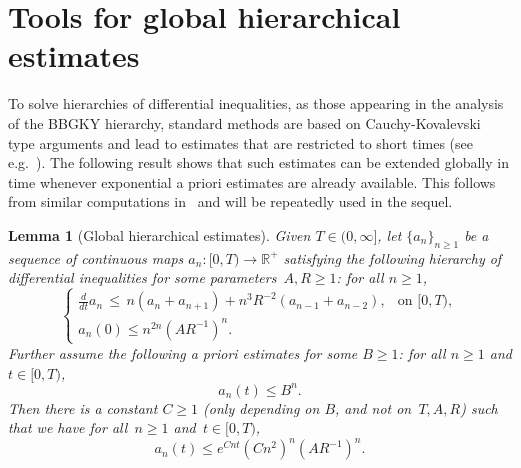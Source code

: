 \documentclass[a4paper,11pt,reqno,noindent]{amsart}
\theoremstyle{plain}
\newtheorem{lem}[theor]{Lemma}
\theoremstyle{definition}
\numberwithin{equation}{section}
\newcommand{\R}{\mathbb R}
\begin{document}
\section{Tools for global hierarchical estimates}
To solve hierarchies of differential inequalities, as those appearing in the analysis of the BBGKY hierarchy, standard methods are based on Cauchy-Kovalevski type arguments and lead to estimates that are restricted to short times (see e.g.~\cite[Section~1.11.2]{Golse-rev2}). The following result shows that such estimates can be extended globally in time whenever exponential a priori estimates are already available. This follows from similar computations in~\cite[Section~3]{PPS-19} and will be repeatedly used in the sequel.

\begin{lem}[Global hierarchical estimates]\label{lem:hier}
Given $T\in(0,\infty]$, let $\{a_n\}_{n\ge1}$ be a sequence of continuous maps $a_n:[0,T)\to\R^+$ satisfying the following hierarchy of differential inequalities for some parameters~$A,R\ge1$: for all $n\ge1$,
\begin{equation}\label{eq:ineq-an}
\left\{\begin{array}{ll}
\tfrac{d}{dt}a_n\,\le\,
n(a_n+a_{n+1})
+n^3R^{-2}(a_{n-1}+a_{n-2}),&\text{on $[0,T)$},\\[1mm]
a_n(0)\le n^{2n}(AR^{-1} )^n.&
\end{array}\right.
\end{equation}
Further assume the following a priori estimates for some $B\ge1$: for all $n\ge1$ and $t\in[0,T)$,
\begin{equation}\label{eq:apriori-an}
a_n(t)\le B^n.
\end{equation}
Then there is a constant $C\ge1$ (only depending on $B$, and not on~$T,A,R$) such that we have for all~$n\ge1$ and~$t\in[0,T)$,
\begin{equation}\label{eq:todo-an}
a_n(t)\le e^{Cnt}(Cn^2)^n(AR^{-1})^n.
\end{equation}
\end{lem}
\end{document}
